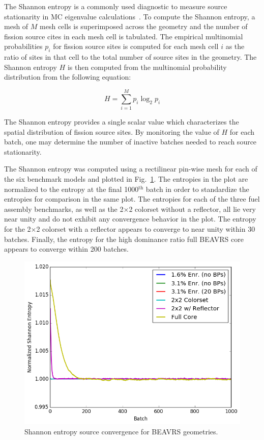 The Shannon entropy is a commonly used diagnostic to measure source stationarity in \ac{MC} eigenvalue calculations~\cite{brown2006entropy}. To compute the Shannon entropy, a mesh of $M$ mesh cells is superimposed across the geometry and the number of fission source cites in each mesh cell is tabulated. The empirical multinomial probabilities $p_{i}$ for fission source sites is computed for each mesh cell $i$ as the ratio of sites in that cell to the total number of source sites in the geometry. The Shannon entropy $H$ is then computed from the multinomial probability distribution from the following equation:

\begin{equation}
\label{eqn:chap7-shannon-entropy}
H = \displaystyle\sum\limits_{i=1}^{M} p_{i} \log_{2} p_{i}
\end{equation}

\noindent The Shannon entropy provides a single scalar value which characterizes the spatial distribution of fission source sites. By monitoring the value of $H$ for each batch, one may determine the number of inactive batches needed to reach source stationarity.

The Shannon entropy was computed using a rectilinear pin-wise mesh for each of the six benchmark models and plotted in Fig.~\ref{fig:chap7-entropy}. The entropies in the plot are normalized to the entropy at the final 1000$^{\text{th}}$ batch in order to standardize the entropies for comparison in the same plot. The entropies for each of the three fuel assembly benchmarks, as well as the 2$\times$2 colorset without a reflector, all lie very near unity and do not exhibit any convergence behavior in the plot. The entropy for the 2$\times$2 colorset with a reflector appears to converge to near unity within 30 batches. Finally, the entropy for the high dominance ratio full \ac{BEAVRS} core appears to converge within 200 batches. 

\begin{figure}[h!]
  \centering
  \includegraphics[width=0.7\linewidth]{figures/benchmarks/entropy/entropy-all}
\caption[Shannon entropy source convergence for BEAVRS geometries]{Shannon entropy source convergence for BEAVRS geometries.}
\label{fig:chap7-entropy}
\end{figure}

